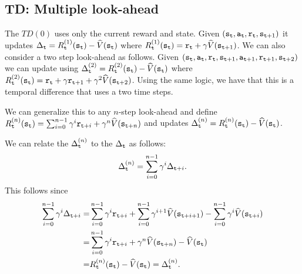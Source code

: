 \begin{advanced}


\end{advanced}

\subsection{TD: Multiple look-ahead}\label{sec:TD_lambda}

The $TD(0)$ uses only the current reward and state. Given
$({\tt s}_{\tt t},{\tt a}_{\tt t},{\tt r}_{\tt t},{\tt s}_{{\tt t}+1})$ it
updates $\Delta_{\tt t}=R^{(1)}_{\tt t}({\tt s}_{\tt t}) -
\widehat{V}({\tt s}_{\tt t})$ where $R^{(1)}_{\tt t}({\tt s}_{\tt t})=
{\tt r}_{\tt t} +\gamma \widehat{V}({\tt s}_{{\tt t}+1})$. We can
also consider a two step look-ahead as follows. Given
$({\tt s}_{\tt t},{\tt a}_{\tt t},{\tt r}_{\tt t},{\tt s}_{{\tt t}+1},{\tt a}_{{\tt t}+1},{\tt r}_{{\tt t}+1},{\tt s}_{{\tt t}+2})$
we can update using
$\Delta^{(2)}_{\tt t}=R^{(2)}_{\tt t}({\tt s}_{\tt t}) -
\widehat{V}({\tt s}_{\tt t})$ where $R^{(2)}_{\tt t}({\tt s}_{\tt t})=
{\tt r}_{\tt t}+\gamma {\tt r}_{{\tt t}+1} +\gamma^2
\widehat{V}({\tt s}_{{\tt t}+2})$. Using the same logic, we have that
this is a temporal difference that uses a two time steps.

We can generalize this to any $n$-step look-ahead and define
$R^{(n)}_{\tt t}({\tt s}_{\tt t})= \sum_{i=0}^{n-1} \gamma^i
{\tt r}_{{\tt t}+i}+\gamma^n \widehat{V}({\tt s}_{{\tt t}+n})$ and
updates $\Delta^{(n)}_{\tt t}=R^{(n)}_{\tt t}({\tt s}_{\tt t}) -
\widehat{V}({\tt s}_{\tt t})$.

We can relate the $\Delta^{(n)}_{\tt t}$ to the $\Delta_{\tt t}$ as
follows:
\[
\Delta^{(n)}_{\tt t}=\sum_{i=0}^{n-1} \gamma^i \Delta_{{\tt t}+i}.
\]
This follows since
\begin{align*}
\sum_{i=0}^{n-1} \gamma^i \Delta_{{\tt t}+i}
=&\sum_{i=0}^{n-1}
\gamma^i {\tt r}_{{\tt t}+i}+ \sum_{i=0}^{n-1} \gamma^{i+1}
\widehat{V}({\tt s}_{{\tt t}+i+1})- \sum_{i=0}^{n-1} \gamma^{i}
\widehat{V}({\tt s}_{{\tt t}+i})\\
=&\sum_{i=0}^{n-1} \gamma^i
{\tt r}_{{\tt t}+i}+\gamma^n
\widehat{V}({\tt s}_{{\tt t}+n})-\widehat{V}({\tt s}_{\tt t})\\
=&R^{(n)}_{\tt t}({\tt s}_{\tt t})-\widehat{V}({\tt s}_{\tt t})=\Delta^{(n)}_{\tt t}.
\end{align*}


